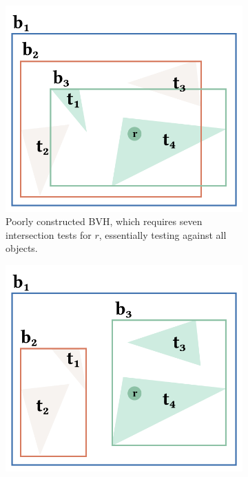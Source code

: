 \begin{figure}[H]
  \centering
  \begin{subfigure}[b]{0.45\textwidth}
    \includegraphics[width=\textwidth]{resources/bvh-bad-visualized.png}
    \caption{Poorly constructed \gls{BVH}, which requires seven intersection tests for $r$, essentially testing against all objects.}
    \label{fig:bvhBad}
  \end{subfigure}
  \hfill
  \begin{subfigure}[b]{0.45\textwidth}
    \includegraphics[width=\textwidth]{resources/bvh-good-visualized.png}

\end{subfigure}
\end{figure}
